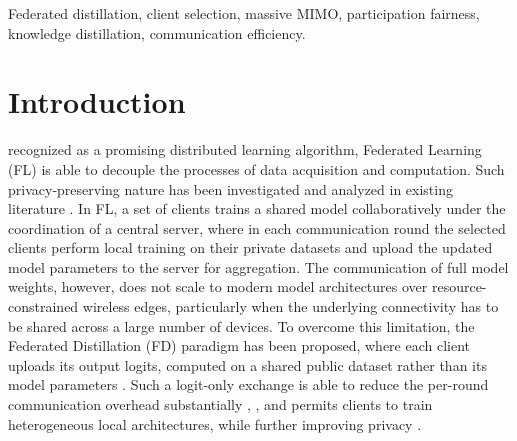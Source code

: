 \documentclass[journal]{IEEEtran}
\newcommand{\rev}[1]{#1}
\begin{document}
\begin{IEEEkeywords}
Federated distillation, client selection, massive MIMO, participation fairness, knowledge distillation, communication efficiency.
\end{IEEEkeywords}

{\renewcommand{\abstractname}{Impact Statement}
\begin{abstract}
FD lets edge devices collaborate on a shared machine-learning model by exchanging only low-dimensional output logits, rather than raw data or model weights, over the wireless link. In real deployments only a small subset of devices is served per round, and selecting that subset uniformly at random leaves some clients under-utilized while others are picked four to fifteen times more often. The algorithm proposed in this paper rotates clients by a participation debt while preferring those whose data covers under-represented classes, guaranteeing equitable selection over short windows of rounds. \rev{On standard benchmarks it lowers the participation imbalance by roughly an order of magnitude while matching the accuracy of the random baseline, and the fairness benefit persists across data heterogeneity levels, downlink channel quality, and client-pool sizes up to two hundred devices.} The algorithm is directly applicable to healthcare-wearable, vehicular-sensing, and Internet-of-Things deployments where equitable device participation and constrained communication budgets are operational requirements.
\end{abstract}}
\vspace{-1em}
\section{Introduction}
\label{sec:introduction}
 recognized as a promising distributed learning algorithm, Federated Learning (FL) \cite{borazjani2026redefining} is able to decouple the processes of data acquisition and computation. Such privacy-preserving nature has been investigated and analyzed in existing literature \cite{tamboli2026p, lim2020federated, huang2024survey,lu2024noniid}. In FL, a set of clients trains a shared model collaboratively under the coordination of a central server, where in each communication round the selected clients perform local training on their private datasets and upload the updated model parameters to the server for aggregation. The communication of full model weights, however, does not scale to modern model architectures over resource-constrained wireless edges, particularly when the underlying connectivity has to be shared across a large number of devices. To overcome this limitation, the Federated Distillation (FD) paradigm \cite{xing2022efficient} has been proposed, where each client uploads its output logits, computed on a shared public dataset rather than its model parameters \cite{itahara2023distillation}. Such a logit-only exchange is able to reduce the per-round communication overhead substantially \cite{sattler2022cfd}, \cite{sattler2023fedaux}, and permits clients to train heterogeneous local architectures, while further improving privacy \cite{chan2021fedhe, cho2023clustered, wu2024fedict}.
\end{document}
